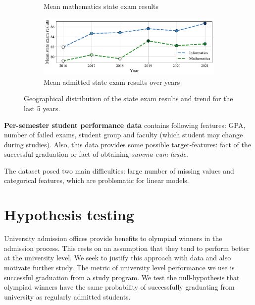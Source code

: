 \documentclass{article}
\begin{document}
\begin{figure}[t!]
\begin{subfigure}{0.49\textwidth}
    \caption{Mean mathematics state exam results}
    \label{fig:mapmath}
  \end{subfigure}
  \begin{subfigure}{0.9\textwidth}
    \includegraphics[width=\linewidth]{../gfx/ege_trend.pdf}
    \caption{Mean admitted state exam results over years}
    \label{fig:egetrend}
  \end{subfigure}\hfil
  \captionsetup{belowskip=-10pt}
  \caption{Geographical distribution of the state exam results and trend for the last 5 years.}
\end{figure}

\textbf{Per-semester student performance data} contains following features: GPA, number of failed exams, student group and faculty (which student may change during studies). Also, this data provides some possible target-features: fact of the successful graduation or fact of obtaining \textit{summa cum laude}.


The dataset posed two main difficulties: large number of missing values and categorical features, which are problematic for linear models. 



\section{Hypothesis testing}
\label{sec:hypothesis}
University admission offices provide benefits to olympiad winners in the admission process. This rests on an assumption that they tend to perform better at the university level.
We seek to justify this approach with data and also motivate further study. The metric of university level performance we use is successful graduation from a study program. We test the null-hypothesis that olympiad winners have the same probability of successfully graduating from university as regularly admitted students.
\end{document}
